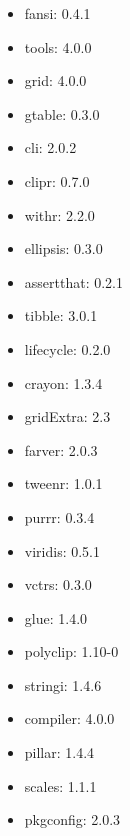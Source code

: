 \documentclass[12pt]{article}
\numberwithin{equation}{section}
\numberwithin{figure}{section}
\begin{document}
\begin{itemize}
\begin{itemize}
		\item fansi: 0.4.1
		\item tools: 4.0.0
		\item grid: 4.0.0
		\item gtable: 0.3.0
		\item cli: 2.0.2
		\item clipr: 0.7.0
		\item withr: 2.2.0
		\item ellipsis: 0.3.0
		\item assertthat: 0.2.1
		\item tibble: 3.0.1
		\item lifecycle: 0.2.0
		\item crayon: 1.3.4
		\item gridExtra: 2.3
		\item farver: 2.0.3
		\item tweenr: 1.0.1
		\item purrr: 0.3.4
		\item viridis: 0.5.1
		\item vctrs: 0.3.0
		\item glue: 1.4.0
		\item polyclip: 1.10-0
		\item stringi: 1.4.6
		\item compiler: 4.0.0
		\item pillar: 1.4.4
		\item scales: 1.1.1
		\item pkgconfig: 2.0.3
	\end{itemize}
\end{itemize}
\end{document}
